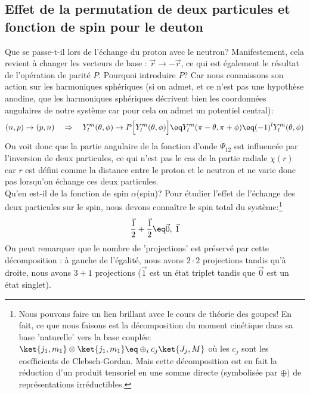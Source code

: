 \subsection{Effet de la permutation de deux particules et fonction de spin pour le deuton}\label{Permut_deuton}


Que se passe-t-il lors de l'échange du proton avec le neutron? Manifestement, cela revient à changer les vecteurs de base : $\vec{r} \rightarrow -\vec{r}$, ce qui est également le résultat de l'opération de parité $P$. Pourquoi introduire $P$? Car nous connaissons son action sur les harmoniques sphériques (si on admet, et ce n'est pas une hypothèse anodine, que les harmoniques sphériques décrivent bien les coordonnées angulaires de notre système car pour cela on admet un potentiel central):
\begin{equation*}
    (n,p)\rightarrow (p,n) \quad \Rightarrow \quad
    Y^m_l(\theta,\phi) \rightarrow P\Big[ Y^m_l(\theta,\phi) \Big] 
    \eq Y^m_l(\pi-\theta,\pi+\phi) \eq (-1)^l Y^m_l(\theta,\phi)
\end{equation*}
On voit donc que la partie angulaire de la fonction d'onde $\Psi_{12}$ est influencée par l'inversion de deux particules, ce qui n'est pas le cas de la partie radiale $\chi(r)$ car $r$ est défini comme la distance entre le proton et le neutron et ne varie donc pas lorsqu'on échange ces deux particules.\\
Qu'en est-il de la fonction de spin $\alpha$(spin)? Pour étudier l'effet de l'échange des deux particules sur le spin, nous devons connaître le spin total du système:\footnote{Nous pouvons faire un lien brillant avec le cours de théorie des goupes! En fait, ce que nous faisons est la décomposition du moment cinétique dans sa base 'naturelle' vers la base couplée: $\ket{j_1,m_1} \otimes \ket{j_1,m_1} \eq \oplus_i c_j \ket{J_j,M}$ où les $c_j$ sont les coefficients de Clebsch-Gordan. Mais cette décomposition est en fait la réduction d'un produit tensoriel en une somme directe (symbolisée par $\oplus)$ de représentations irréductibles.}
\begin{equation*}
    \vec{\dfrac{1}{2}} + \vec{\dfrac{1}{2}} \eq \vec{0}, \: \vec{1}
\end{equation*}
On peut remarquer que le nombre de 'projections' est préservé par cette décomposition : à gauche de l'égalité, nous avons $2\cdot 2$ projections tandis qu'à droite, nous avons $3+1$ projections ($\vec{1}$ est un état triplet tandis que $\vec{0}$ est un état singlet).\\

